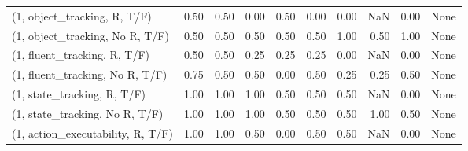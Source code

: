 \begin{table*}[h!]
\begin{adjustbox}{width=2\columnwidth,center}
\begin{tabular}{lrrr|rrr|rrr}
\midrule
(1, object\_tracking, R, T/F)         &                      0.50 &                  0.50 &                      0.00 &                          0.50 &                      0.00 &                          0.00 &                                    NaN &                               0.00 &                                  None \\
(1, object\_tracking, No R, T/F)      &                      0.50 &                  0.50 &                      0.50 &                          0.50 &                      0.50 &                          1.00 &                                   0.50 &                               1.00 &                                  None \\
(1, fluent\_tracking, R, T/F)         &                      0.50 &                  0.50 &                      0.25 &                          0.25 &                      0.25 &                          0.00 &                                    NaN &                               0.00 &                                  None \\
(1, fluent\_tracking, No R, T/F)      &                      0.75 &                  0.50 &                      0.50 &                          0.00 &                      0.50 &                          0.25 &                                   0.25 &                               0.50 &                                  None \\
(1, state\_tracking, R, T/F)          &                      1.00 &                  1.00 &                      1.00 &                          0.50 &                      0.50 &                          0.50 &                                    NaN &                               0.00 &                                  None \\
(1, state\_tracking, No R, T/F)       &                      1.00 &                  1.00 &                      1.00 &                          0.50 &                      0.50 &                          0.50 &                                   1.00 &                               0.50 &                                  None \\
(1, action\_executability, R, T/F)    &                      1.00 &                  1.00 &                      0.50 &                          0.00 &                      0.50 &                          0.50 &                                    NaN &                               0.00 &                                  None \\

\end{tabular}
\end{adjustbox}
\end{table*}
